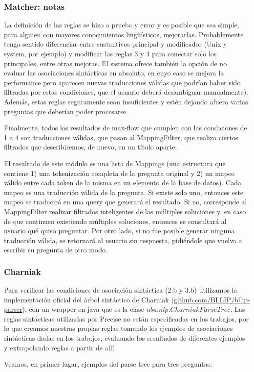 \begin{frame}
\frametitle{Matcher: notas}
La definición de las reglas se hizo a prueba y error y es posible que sea simple, para alguien con mayores conocimientos lingüísticos, mejorarlas. Probablemente tenga sentido diferenciar entre sustantivos principal y modificador (Unix y system, por ejemplo) y modificar las reglas 3 y 4 para conectar solo los principales, entre otras mejoras. El sistema ofrece también la opción de no evaluar las asociaciones sintácticas en absoluto, en cuyo caso se mejora la performance pero aparecen nuevas traducciones válidas que podrían haber sido filtradas por estas condiciones, que el usuario deberá desambiguar manualmente).
Además, estas reglas seguramente sean insuficientes y estén dejando afuera varias preguntas que deberían poder procesarse.

Finalmente, todos los resultados de max-flow que cumplen con las condiciones de 1 a  4 son traducciones válidas, que pasan al MappingFilter, que realiza ciertos filtrados que describiremos, de nuevo, en un título aparte.

El resultado de este módulo es una lista de Mappings (una estructura que contiene 1) una tokenización completa de la pregunta original y 2) un mapeo válido entre cada token de la misma en un elemento de la base de datos). Cada mapeo es una traducción válida de la pregunta. Si existe solo uno, entonces este mapeo se traducirá en una query que generará el resultado. Si no, corresponde al MappingFilter realizar filtrados inteligentes de las múltiples soluciones y, en caso de que continuen existiendo múltiples soluciones, entonces se consultará al usuario qué quiso preguntar. Por otro lado, si no fue posible generar ninguna traducción válida, se retornará al usuario sin respuesta, pidiéndole que vuelva a escribir su pregunta de otro modo.


\end{frame}



\begin{frame}
\frametitle{Charniak}
Para verificar las condiciones de asociación sintáctica (2.b y 3.b) utilizamos la implementación oficial del árbol sintáctico de Charniak (\url{github.com/BLLIP/bllip-parser}), con un wrapper en java que es la clase $uba.nlp.CharniakParseTree$. Las reglas sintácticas utilizadas por Precise no están especificadas en los trabajos, por lo que creamos nuestras propias reglas tomando los ejemplos de asociaciones sintácticas dadas en los trabajos, evaluando los resultados de diferentes ejemplos y extrapolando reglas a partir de allí.


Veamos, en primer lugar, ejemplos del parse tree para tres preguntas:

\end{frame}


